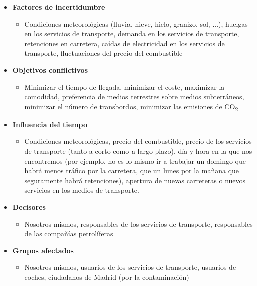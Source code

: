 \documentclass[12pt,a4paper,openright,final]{article}
\begin{document}
\begin{itemize}

\item \textbf{Factores de incertidumbre}

\begin{itemize}
\item Condiciones meteorológicas (lluvia, nieve, hielo, granizo, sol, ...), huelgas en los servicios de transporte, demanda en los servicios de transporte, retenciones en carretera, caídas de electricidad en los servicios de transporte, fluctuaciones del precio del combustible
\end{itemize}

\item \textbf{Objetivos conflictivos}

\begin{itemize}
\item Minimizar el tiempo de llegada, minimizar el coste, maximizar la comodidad, preferencia de medios terrestres sobre medios subterráneos, minimizar el número de transbordos, minimizar las emisiones de CO\textsubscript{2}
\end{itemize}

\item \textbf{Influencia del tiempo}

\begin{itemize}
\item Condiciones meteorológicas, precio del combustible, precio de los servicios de transporte (tanto a corto como a largo plazo), día y hora en la que nos encontremos (por ejemplo, no es lo mismo ir a trabajar un domingo que habrá menos tráfico por la carretera, que un lunes por la mañana que seguramente habrá retenciones), apertura de nuevas carreteras o nuevos servicios en los medios de transporte.
\end{itemize}

\item \textbf{Decisores}

\begin{itemize}
\item Nosotros mismos, responsables de los servicios de transporte, responsables de las compañías petrolíferas
\end{itemize}

\item \textbf{Grupos afectados}

\begin{itemize}
\item Nosotros mismos, usuarios de los servicios de transporte, usuarios de coches, ciudadanos de Madrid (por la contaminación)
\end{itemize}

\end{itemize}
\end{document}

